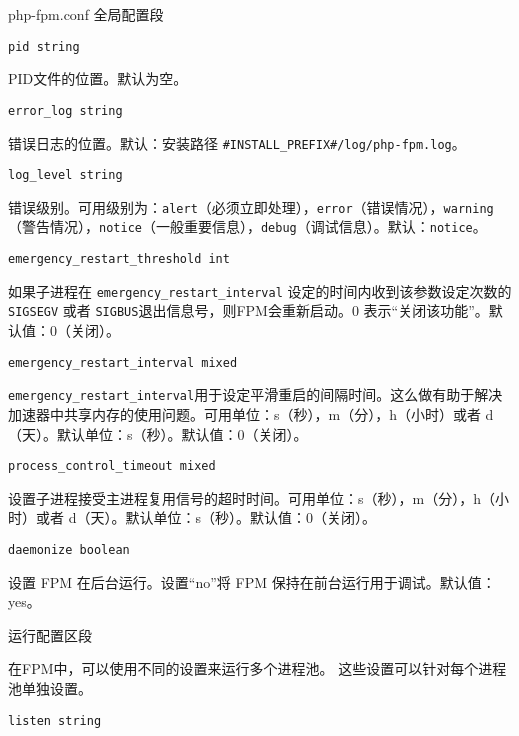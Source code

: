 \begin{compactitem}
\item php-fpm.conf 全局配置段

\begin{compactitem}
\item \texttt{pid string}

PID文件的位置。默认为空。

\item \texttt{error\_log string}

错误日志的位置。默认：安装路径 \texttt{\#INSTALL\_PREFIX\#/log/php-fpm.log}。

\item \texttt{log\_level string}

错误级别。可用级别为：\texttt{alert}（必须立即处理），\texttt{error}（错误情况），\texttt{warning}（警告情况），\texttt{notice}（一般重要信息），\texttt{debug}（调试信息）。默认：\texttt{notice}。

\item \texttt{emergency\_restart\_threshold int}

如果子进程在 \texttt{emergency\_restart\_interval} 设定的时间内收到该参数设定次数的 \texttt{SIGSEGV} 或者 \texttt{SIGBUS}退出信息号，则FPM会重新启动。0 表示“关闭该功能”。默认值：0（关闭）。

\item \texttt{emergency\_restart\_interval mixed}

\texttt{emergency\_restart\_interval}用于设定平滑重启的间隔时间。这么做有助于解决加速器中共享内存的使用问题。可用单位：s（秒），m（分），h（小时）或者 d（天）。默认单位：s（秒）。默认值：0（关闭）。

\item \texttt{process\_control\_timeout mixed}

设置子进程接受主进程复用信号的超时时间。可用单位：s（秒），m（分），h（小时）或者 d（天）。默认单位：s（秒）。默认值：0（关闭）。

\item \texttt{daemonize boolean}

设置 FPM 在后台运行。设置“no”将 FPM 保持在前台运行用于调试。默认值：yes。

\end{compactitem}

\item 运行配置区段

在FPM中，可以使用不同的设置来运行多个进程池。 这些设置可以针对每个进程池单独设置。

\begin{compactitem}
\item \texttt{listen string}


\end{compactitem}
\end{compactitem}
